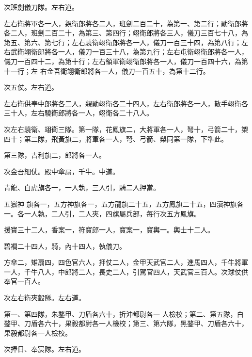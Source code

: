 \begin{pinyinscope}
 次班劍儀刀隊。左右道。



 左右衛將軍各一人，親衛郎將各二人，班劍二百二十，為第一、第二行；勛衛郎將各二人，班劍二百二十，為第三、第四行；翊衛郎將各三人，儀刀三百七十八，為第五、第六、第七行；左右驍衛翊衛郎將各一人，儀刀一百三十四，為第八行；左右武衛翊衛郎將各一人，儀刀一百三十八，為第九行；左右屯衛翊衛郎將各一人，儀刀一百四十二，為第十行；左右領軍衛翊衛郎將各一人，儀刀一百四十六，為第十一行；左
 右金吾衛翊衛郎將各一人，儀刀一百五十，為第十二行。



 次五仗。左右道。



 左右衛供奉中郎將各二人，親勛翊衛各二十四人，左右衛郎將各一人，散手翊衛各三十人，左右驍衛郎將各一人，翊衛各二十八人。



 次左右驍衛、翊衛三隊。第一隊，花鳳旗二，大將軍各一人，弩十，弓箭二十，槊四十；第二隊，飛黃旗二，將軍各一人，弩、弓箭、槊同第一隊，下準此。



 第三隊，吉利旗二，郎將各一人。



 次金吾細仗。殿中傘扇，千牛。中道。



 青龍、白虎旗各一，一人執，三人引，騎二人押當。



 五嶽神
 旗各一，五方神旗各一，五方龍旗二十五，五方鳳旗二十五，四瀆神旗各一。各一人執，二人引，二人夾，四旗屬兵部，每行次五方鳳旗。



 援寶三十二人，香案一，符寶郎一人，寶案一，寶輿一。輿士十二人。



 碧襴二十四人，騎，內十四人，執儀刀。



 方傘二，雉扇四，四色官六人，押仗二人，金甲天武官二人，進馬四人，千牛將軍一人，千牛八人，中郎將二人，長史二人，引駕官四人，天武官三百人。次球仗供奉官一百人。



 次左右衛夾轂隊。左右道。



 第一、第四隊，朱鍪甲、刀盾各六十，折沖都尉各一
 人檢校；第二、第五隊，白鍪甲、刀盾各六十，果毅都尉各一人檢校；第三、第六隊，黑鍪甲、刀盾各六十，果毅都尉各一人檢校。



 次捧日、奉宸隊。左右道。




\end{pinyinscope}
